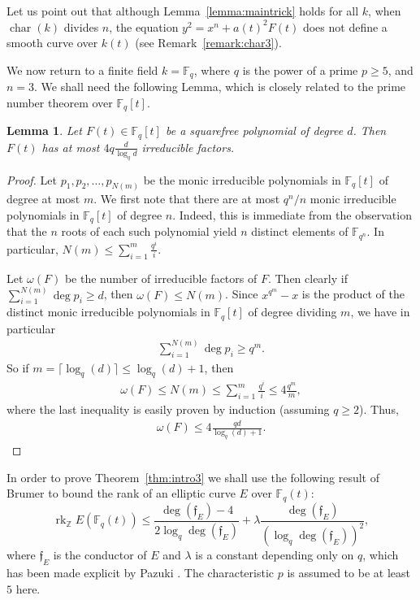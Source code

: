 \documentclass[11pt]{article}
\newcommand{\Z}{\ensuremath{\mathbb{Z}}}
\theoremstyle{plain}
\newtheorem{lemma}[theorem]{Lemma}
\theoremstyle{definition}
\DeclareMathOperator{\rk}{rk}
\DeclareMathOperator{\car}{char}
\begin{document}
Let us point out that although Lemma~\ref{lemma:maintrick} holds for all $k$, when $\car(k)$ divides $n$, the equation $y^2=x^n+a(t)^2F(t)$ does not define a smooth curve over $k(t)$ (see Remark~\ref{remark:char3}).

We now return to a finite field $k=\mathbb{F}_q$, where $q$ is the power of a prime $p\geq 5$, and $n=3$.
We shall need the following Lemma, which is closely related to the prime number theorem over $\mathbb{F}_q[t]$.



\begin{lemma}
\label{irreduciblefactors}
Let $F(t)\in \mathbb{F}_q[t]$ be a squarefree polynomial of degree $d$. Then $F(t)$ has at most $4q\frac{d}{\log_q d}$ irreducible factors.
\end{lemma}

\begin{proof}
Let $p_1,p_2,\ldots,p_{N(m)}$ be the monic irreducible polynomials in $\mathbb{F}_q[t]$ of degree at most $m$.  We first note that there are at most $q^n/n$ monic irreducible polynomials in $\mathbb{F}_q[t]$ of degree $n$. Indeed, this is immediate from the observation that the $n$ roots of each such polynomial yield $n$ distinct elements of $\mathbb{F}_{q^n}$. In particular, $N(m)\leq \sum_{i=1}^m \frac{q^i}{i}$.

Let $\omega(F)$ be the number of irreducible factors of $F$. Then clearly if $\sum_{i=1}^{N(m)}\deg p_i\geq d$, then $\omega(F)\leq N(m)$. Since $x^{q^m}-x$ is the product of the distinct monic irreducible polynomials in $\mathbb{F}_q[t]$ of degree dividing $m$, we have in particular
\begin{align*}
\sum_{i=1}^{N(m)}\deg p_i\geq q^m.
\end{align*}
So if $m=\lceil\log_q(d)\rceil\leq \log_q(d)+1$, then
\begin{align*}
\omega(F)\leq N(m)\leq \sum_{i=1}^m \frac{q^i}{i}\leq 4\frac{q^m}{m}, 
\end{align*}
where the last inequality is easily proven by induction (assuming $q\geq 2$). Thus, 
\begin{align*}
\omega(F)\leq 4\frac{qd}{\log_q(d)+1}.
\end{align*}
\end{proof}



In order to prove Theorem~\ref{thm:intro3} we shall use the following result of Brumer \cite[Proposition~6.9]{brumer92} to bound the rank of an elliptic curve $E$ over $\mathbb{F}_q(t)$:
\begin{equation}
\label{eq:Brumer}
\rk_{\Z} E(\mathbb{F}_q(t))\leq \frac{\deg(\mathfrak{f}_E)-4}{2\log_q \deg(\mathfrak{f}_E)}+ \lambda\frac{\deg(\mathfrak{f}_E)}{(\log_q \deg(\mathfrak{f}_E))^2},
\end{equation}
where $\mathfrak{f}_E$ is the conductor of $E$ and $\lambda$ is a constant depending only on $q$, which has been made explicit by Pazuki \cite{pazuki2022}. The characteristic $p$ is assumed to be at least $5$ here.
\end{document}

